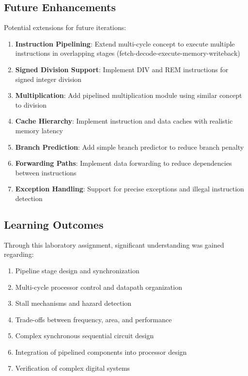 \documentclass[a4paper, 11pt]{article}
\begin{document}
\subsection{Future Enhancements}

Potential extensions for future iterations:

\begin{enumerate}
    \item \textbf{Instruction Pipelining}: Extend multi-cycle concept to execute multiple instructions in overlapping stages (fetch-decode-execute-memory-writeback)
    
    \item \textbf{Signed Division Support}: Implement DIV and REM instructions for signed integer division
    
    \item \textbf{Multiplication}: Add pipelined multiplication module using similar concept to division
    
    \item \textbf{Cache Hierarchy}: Implement instruction and data caches with realistic memory latency
    
    \item \textbf{Branch Prediction}: Add simple branch predictor to reduce branch penalty
    
    \item \textbf{Forwarding Paths}: Implement data forwarding to reduce dependencies between instructions
    
    \item \textbf{Exception Handling}: Support for precise exceptions and illegal instruction detection
\end{enumerate}

\subsection{Learning Outcomes}

Through this laboratory assignment, significant understanding was gained regarding:

\begin{enumerate}
    \item Pipeline stage design and synchronization
    \item Multi-cycle processor control and datapath organization
    \item Stall mechanisms and hazard detection
    \item Trade-offs between frequency, area, and performance
    \item Complex synchronous sequential circuit design
    \item Integration of pipelined components into processor design
    \item Verification of complex digital systems
\end{enumerate}
\end{document}
